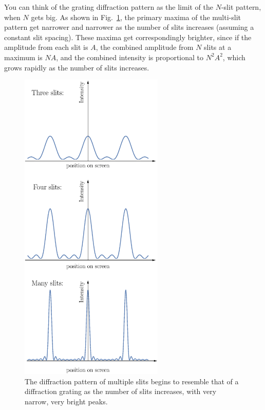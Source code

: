 You can think  of the grating diffraction pattern as  the limit of the
$N$-slit    pattern,    when   $N$    gets    big.    As   shown    in
Fig.~\ref{gratingSlitPatterns}, the  primary maxima of  the multi-slit
pattern get  narrower and  narrower as the  number of  slits increases
(assuming a constant slit  spacing).  These maxima get correspondingly
brighter, since if  the amplitude from each slit  is $A$, the combined
amplitude  from $N$  slits at  a maximum  is $N  A$, and  the combined
intensity is  proportional to  $N^2 A^2$, which  grows rapidly  as the
number of slits increases.


\begin{figure}
\begin{center}\includegraphics[width=2.7in]{phasors/gratingSlitPatterns}
\end{center}
\caption{\label{gratingSlitPatterns} The diffraction pattern of multiple
slits begins to resemble that of a diffraction grating as the number of 
slits increases, with very narrow, very bright peaks.}
\end{figure}


